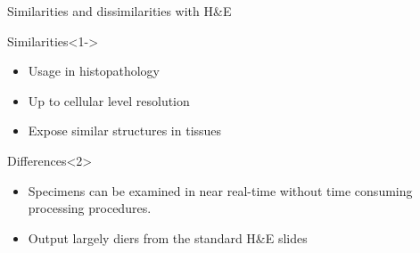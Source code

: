 \documentclass[t]{beamer}
\begin{document}
\begin{frame}{Similarities and dissimilarities with H\&E}
    \begin{block}{Similarities}<1->
    {
        \begin{itemize}
        \item Usage in histopathology
        \item Up to cellular level resolution
	\item Expose similar structures in tissues
        \end{itemize}
    }
    \end{block}
    \begin{alertblock}{Differences}<2>
    {
        \begin{itemize}
        \item Specimens can be examined in near real-time without time consuming processing procedures.
        \item Output largely diers from the standard H\&E slides
        \end{itemize}
    }
    \end{alertblock}

\end{frame}
\end{document}
